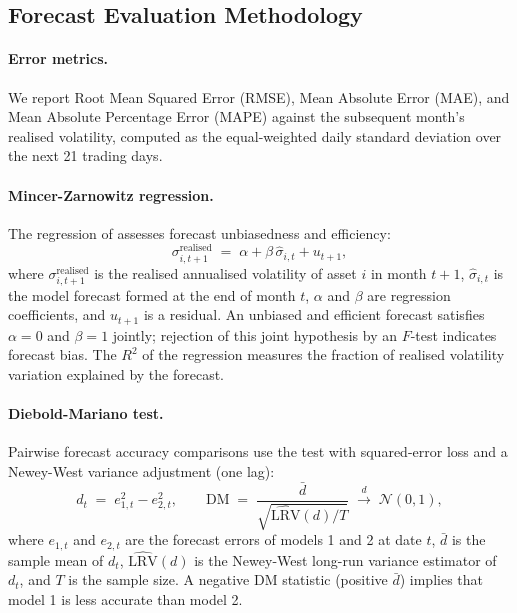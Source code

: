 \documentclass[12pt, a4paper]{article}
\newcommand{\shat}{\hat{\sigma}}
\begin{document}
\subsection{Forecast Evaluation Methodology}

\paragraph{Error metrics.}
We report Root Mean Squared Error (RMSE), Mean Absolute Error (MAE), and Mean Absolute
Percentage Error (MAPE) against the subsequent month's realised volatility, computed as
the equal-weighted daily standard deviation over the next 21 trading days.

\paragraph{Mincer-Zarnowitz regression.}
The regression of \citet{Mincer1969} assesses forecast unbiasedness and efficiency:
\begin{equation}
  \sigma_{i,t+1}^{\mathrm{realised}} \;=\; \alpha + \beta\,\shat_{i,t} + u_{t+1},
  \label{eq:mz}
\end{equation}
where $\sigma_{i,t+1}^{\mathrm{realised}}$ is the realised annualised volatility of asset
$i$ in month $t+1$, $\shat_{i,t}$ is the model forecast formed at the end of month $t$,
$\alpha$ and $\beta$ are regression coefficients, and $u_{t+1}$ is a residual. An unbiased
and efficient forecast satisfies $\alpha = 0$ and $\beta = 1$ jointly; rejection of this
joint hypothesis by an $F$-test indicates forecast bias. The $R^2$ of the regression
measures the fraction of realised volatility variation explained by the forecast.

\paragraph{Diebold-Mariano test.}
Pairwise forecast accuracy comparisons use the \citet{DM1995} test with squared-error
loss and a Newey-West variance adjustment (one lag):
\begin{equation}
  d_t \;=\; e_{1,t}^2 - e_{2,t}^2,
  \qquad
  \mathrm{DM} \;=\; \frac{\bar{d}}{\sqrt{\widehat{\mathrm{LRV}}(d)/T}}
                  \;\xrightarrow{d}\; \mathcal{N}(0,1),
\end{equation}
where $e_{1,t}$ and $e_{2,t}$ are the forecast errors of models 1 and 2 at date $t$,
$\bar{d}$ is the sample mean of $d_t$, $\widehat{\mathrm{LRV}}(d)$ is the
Newey-West long-run variance estimator of $d_t$, and $T$ is the sample size. A negative
DM statistic (positive $\bar{d}$) implies that model 1 is less accurate than model 2.
\end{document}
